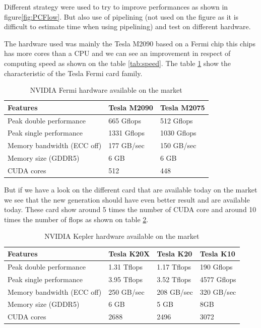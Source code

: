 Different strategy were used to try to improve performances as shown in figure\ref{fig:PCFlow}. But also use of pipelining (not used on the figure as it is difficult to estimate time when using pipelining) and test on different hardware.

The hardware used was mainly the Tesla M2090 based on a Fermi chip this chips has more cores than a CPU and we can see an improvement in respect of computing speed as shown on the table \ref{tab:speed}. The table \ref{tab:fermi} show the characteristic of the Tesla Fermi card family.

\begin{table}[H]
	\caption{NVIDIA Fermi hardware available on the market\cite{nvidia}}
	\label{tab:fermi}
	\centering
	\begin{tabular}{|l|l|l|}
		\hline
			Features & Tesla M2090 & Tesla M2075 \\
		\hline
		\hline
			Peak double performance & 665 Gflops  & 512 Gflops \\
		\hline
			Peak single performance & 1331 Gflops & 1030 Gflops \\
		\hline
			Memory bandwidth (ECC off) & 177 GB/sec & 150 GB/sec \\
		\hline
			Memory size (GDDR5) & 6 GB & 6 GB \\
		\hline
			CUDA cores & 512 & 448 \\
		\hline
	\end{tabular}
\end{table}

But if we have a look on the different card that are available today on the market we see that the new generation should have even better result and are available today. These card show around 5 times the number of \gls{CUDA} core and around 10 times the number of \gls{flops} as shown on table \ref{tab:kepler}.

\begin{table}[H]
	\centering
	\caption{NVIDIA Kepler hardware available on the market\cite{nvidia}}
	\label{tab:kepler}
	\begin{tabular}{|l|l|l|l|}
		\hline
			Features & Tesla K20X & Tesla K20 & Tesla K10 \\
		\hline
		\hline
			Peak double performance & 1.31 Tflops & 1.17 Tflops & 190 Gflops \\
		\hline
			Peak single performance & 3.95 Tflops & 3.52 Tflops & 4577 Gflops \\
		\hline
			Memory bandwidth (ECC off) & 250 GB/sec & 208 GB/sec & 320 GB/sec \\
		\hline
			Memory size (GDDR5) & 6 GB & 5 GB & 8GB \\
		\hline
			CUDA cores & 2688 & 2496 & 3072 \\
		\hline
	\end{tabular}
\end{table}


